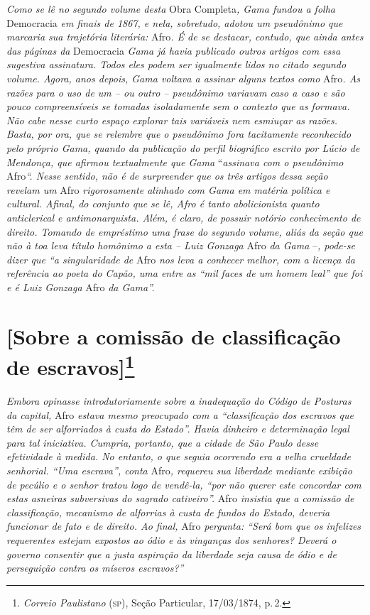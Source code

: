 \begin{argumento}
\emph{Como se lê no segundo volume desta} Obra Completa\emph{, Gama
fundou a folha} Democracia \emph{em finais de 1867, e nela, sobretudo,
adotou um pseudônimo que marcaria sua trajetória literária:} Afro\emph{.
É de se destacar, contudo, que ainda antes das páginas da} Democracia
\emph{Gama já havia publicado outros artigos com essa sugestiva
assinatura. Todos eles podem ser igualmente lidos no citado segundo
volume. Agora, anos depois, Gama voltava a assinar alguns textos como}
Afro\emph{. As razões para o uso de um -- ou outro -- pseudônimo
variavam caso a caso e são pouco compreensíveis se tomadas isoladamente
sem o contexto que as formava. Não cabe nesse curto espaço explorar tais
variáveis nem esmiuçar as razões. Basta, por ora, que se relembre que o
pseudônimo fora tacitamente reconhecido pelo próprio Gama, quando da
publicação do perfil biográfico escrito por Lúcio de Mendonça, que
afirmou textualmente que Gama} ``\emph{assinava com o pseudônimo}
Afro\emph{``. Nesse sentido, não é de surpreender que os três artigos
dessa seção revelam um} Afro \emph{rigorosamente alinhado com Gama em
matéria política e cultural. Afinal, do conjunto que se lê, Afro é
tanto} \emph{abolicionista quanto anticlerical e antimonarquista. Além,
é claro, de possuir notório conhecimento de direito. Tomando de
empréstimo uma frase do segundo volume, aliás da seção que não à toa
leva título homônimo a esta -- Luiz Gonzaga} Afro \emph{da Gama}
--\emph{, pode-se dizer que ``a singularidade de} Afro \emph{nos leva a
conhecer melhor, com a licença da referência ao poeta do Capão, uma
entre as ``mil faces de um homem leal'' que foi e é Luiz Gonzaga} Afro
\emph{da Gama''.}
\end{argumento}

\chapter{{[}Sobre a comissão de classificação 
de escravos{]}\footnote{\emph{Correio Paulistano} (\textsc{sp}), Seção Particular, 17/03/1874, p.\,2.}} %

\begin{didascalia}
\emph{Embora opinasse introdutoriamente sobre a inadequação do Código de
Posturas da capital,} Afro \emph{estava mesmo preocupado com a
``classificação dos escravos que têm de ser alforriados à custa do
Estado''. Havia dinheiro e determinação legal para tal iniciativa.
Cumpria, portanto, que a cidade de São Paulo desse efetividade à medida.
No entanto, o que seguia ocorrendo era a velha crueldade senhorial. ``Uma
escrava'', conta} Afro\emph{, requereu sua liberdade mediante exibição de
pecúlio e o senhor tratou logo de vendê-la, ``por não querer este
concordar com estas asneiras subversivas do sagrado cativeiro''.} Afro
\emph{insistia que a comissão de classificação, mecanismo de alforrias à
custa de fundos do Estado, deveria funcionar de fato e de direito. Ao
final,} Afro \emph{pergunta: ``Será bom que os infelizes requerentes
estejam expostos ao ódio e às vinganças dos senhores? Deverá o governo
consentir que a justa aspiração da liberdade seja causa de ódio e de
perseguição contra os míseros escravos?''}
\end{didascalia}

